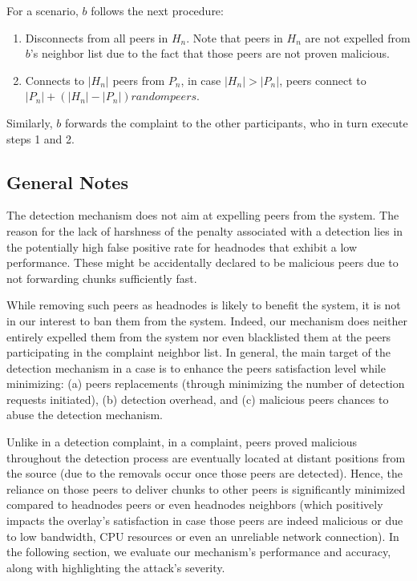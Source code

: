 For a \drop scenario, $b$ follows the next procedure:
\begin{enumerate}
 \item Disconnects from all peers in $H_n$. Note that peers in $H_n$ are not expelled from $b$'s neighbor list due to the fact that those peers are not proven malicious. 
 \item Connects to $|H_n|$ peers from $P_n$, in case $|H_n|>|P_n|$, peers connect to $|P_n|+(|H_n|-|P_n|)random peers$.
\end{enumerate}
Similarly, $b$ forwards the complaint to the other participants, who in turn execute steps 1 and 2.

\subsection{General Notes}
The detection mechanism does not aim at expelling peers from the system.
The reason for the lack of harshness of the penalty associated with a detection lies in the potentially high false positive rate for headnodes that exhibit a low performance. These might be accidentally declared to be malicious peers due to not forwarding chunks sufficiently fast. 

While removing such peers as headnodes is likely to benefit the system, it is not in our interest to ban them from the system. Indeed, our mechanism does neither entirely expelled them from the system nor even blacklisted them at the peers participating in the complaint neighbor list. 
In general, the main target of the detection mechanism in a \drop case is to enhance the peers satisfaction level while minimizing: (a) peers replacements (through minimizing the number of detection requests initiated), (b) detection overhead, and (c) malicious peers chances to abuse the detection mechanism.

Unlike in a \drop detection complaint, in a \manp complaint, peers proved malicious throughout the detection process are eventually located at distant positions from the source (due to the removals occur once those peers are detected).
Hence, the reliance on those peers to deliver chunks to other peers is significantly minimized compared to headnodes peers or even headnodes neighbors (which positively impacts the overlay's satisfaction in case those peers are indeed malicious or due to low bandwidth, CPU resources or even an unreliable network connection).
In the following section, we evaluate our mechanism's performance and accuracy, along with highlighting the attack's severity.




